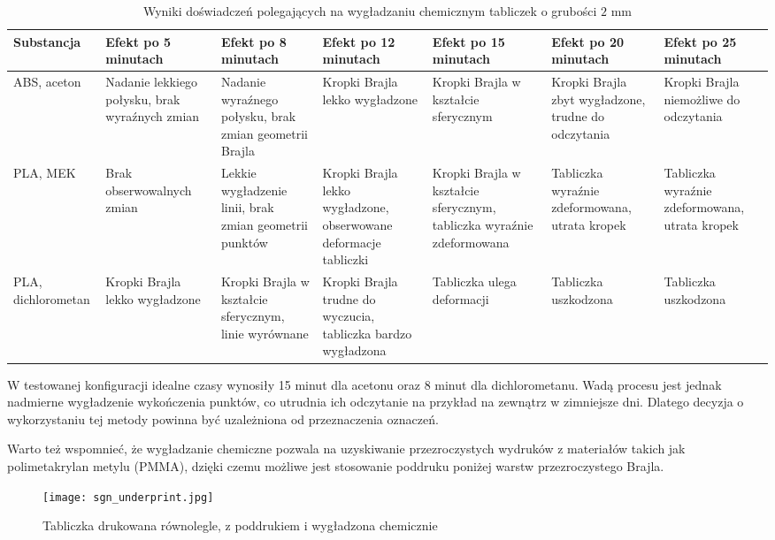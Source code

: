 \documentclass[12pt,a4paper]{article}
\begin{document}
\begin{table}[t]
\caption{Wyniki doświadczeń polegających na wygładzaniu chemicznym tabliczek o grubości $2 \text{ mm}$}
\begin{tabular}{|l|l|l|l|l|l|l|}
\hline
Substancja & Efekt po 5 minutach & Efekt po 8 minutach & Efekt po 12 minutach & Efekt po 15 minutach & Efekt po 20 minutach & Efekt po 25 minutach \\
\hline
ABS, aceton & Nadanie lekkiego połysku, brak wyraźnych zmian & Nadanie wyraźnego połysku, brak zmian geometrii Brajla & Kropki Brajla lekko wygładzone & Kropki Brajla w kształcie sferycznym & Kropki Brajla zbyt wygładzone, trudne do odczytania & Kropki Brajla niemożliwe do odczytania \\
\hline
PLA, MEK & Brak obserwowalnych zmian & Lekkie wygładzenie linii, brak zmian geometrii punktów & Kropki Brajla lekko wygładzone, obserwowane deformacje tabliczki & Kropki Brajla w kształcie sferycznym, tabliczka wyraźnie zdeformowana & Tabliczka wyraźnie zdeformowana, utrata kropek & Tabliczka wyraźnie zdeformowana, utrata kropek \\
\hline
PLA, dichlorometan & Kropki Brajla lekko wygładzone & Kropki Brajla w kształcie sferycznym, linie wyrównane & Kropki Brajla trudne do wyczucia, tabliczka bardzo wygładzona & Tabliczka ulega deformacji & Tabliczka uszkodzona & Tabliczka uszkodzona \\
\hline
\end{tabular} 
\end{table}

W testowanej konfiguracji idealne czasy wynosiły 15 minut dla acetonu oraz 8 minut dla dichlorometanu.
Wadą procesu jest jednak nadmierne wygładzenie wykończenia punktów, co utrudnia ich odczytanie na przykład na zewnątrz w zimniejsze dni. Dlatego decyzja o wykorzystaniu tej metody powinna być uzależniona od przeznaczenia oznaczeń.

Warto też wspomnieć, że wygładzanie chemiczne pozwala na uzyskiwanie przezroczystych wydruków z materiałów takich jak polimetakrylan metylu (PMMA), dzięki czemu możliwe jest stosowanie poddruku poniżej warstw przezroczystego Brajla.

\begin{figure}
\texttt{[image: sgn\_underprint.jpg]}
\caption{Tabliczka drukowana równolegle, z poddrukiem i wygładzona chemicznie}
\end{figure}
\end{document}
